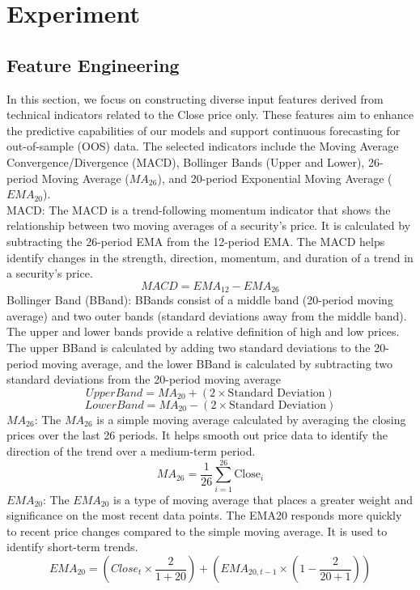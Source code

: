 \documentclass{ieeeojies}
\begin{document}
\section{Experiment}
\subsection{Feature Engineering}
In this section, we focus on constructing diverse input features derived from technical indicators related to the Close price only. These features aim to enhance the predictive capabilities of our models and support continuous forecasting for out-of-sample (OOS) data. The selected indicators include the Moving Average Convergence/Divergence (MACD), Bollinger Bands (Upper and Lower), 26-period Moving Average (\(MA_{26}\)), and 20-period Exponential Moving Average (\(EMA_{20}\)).\\ 
MACD: The MACD is a trend-following momentum indicator that shows the relationship between two moving averages of a security’s price. It is calculated by subtracting the 26-period EMA from the 12-period EMA. The MACD helps identify changes in the strength, direction, momentum, and duration of a trend in a security’s price.
\begin{dmath*}
    MACD = EMA_{12} - EMA_{26}
\end{dmath*}
Bollinger Band (BBand): BBands consist of a middle band (20-period moving average) and two outer bands (standard deviations away from the middle band). The upper and lower bands provide a relative definition of high and low prices. The upper BBand is calculated by adding two standard deviations to the 20-period moving average, and the lower BBand is calculated by subtracting two standard deviations from the 20-period moving average
\begin{dmath*}
    Upper Band = MA_{20} + (2 \times \text{Standard Deviation})
\end{dmath*}
\begin{dmath*}
    Lower Band = MA_{20} - (2 \times \text{Standard Deviation})
\end{dmath*}
\noindent
\(MA_{26}\): The \(MA_{26}\) is a simple moving average calculated by averaging the closing prices over the last 26 periods. It helps smooth out price data to identify the direction of the trend over a medium-term period.
\begin{dmath*}
    MA_{26} = \frac{1}{26} \sum_{i=1}^{26} \text{Close}_i
\end{dmath*}
\noindent
\(EMA_{20}\): The \(EMA_{20}\) is a type of moving average that places a greater weight and significance on the most recent data points. The EMA20 responds more quickly to recent price changes compared to the simple moving average. It is used to identify short-term trends.
\begin{dmath*}
    EMA_{20} = (Close_t \times \frac{2}{1+20}) + (EMA_{20,t-1} \times (1-\frac{2}{20+1}))
\end{dmath*}
\end{document}
